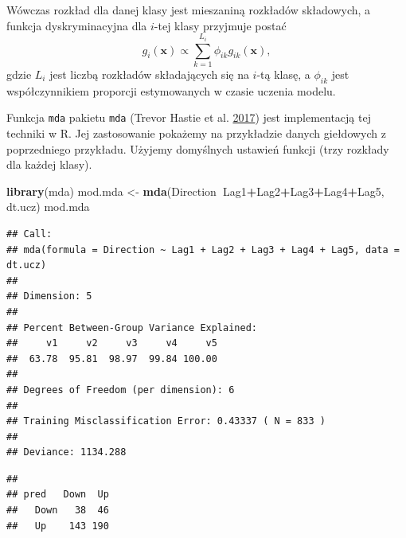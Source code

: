 \documentclass[
]{book}
\newenvironment{Shaded}{\begin{snugshade}}{\end{snugshade}}
\newcommand{\DataTypeTok}[1]{\textcolor[rgb]{0.13,0.29,0.53}{#1}}
\newcommand{\KeywordTok}[1]{\textcolor[rgb]{0.13,0.29,0.53}{\textbf{#1}}}
\newcommand{\NormalTok}[1]{#1}
\newcommand{\OperatorTok}[1]{\textcolor[rgb]{0.81,0.36,0.00}{\textbf{#1}}}
\newcommand{\StringTok}[1]{\textcolor[rgb]{0.31,0.60,0.02}{#1}}
\theoremstyle{plain}
\theoremstyle{definition}
\theoremstyle{definition}
\theoremstyle{definition}
\theoremstyle{definition}
\theoremstyle{remark}
\let\BeginKnitrBlock\begin \let\EndKnitrBlock\end
\begin{document}
Wówczas rozkład dla danej klasy jest mieszaniną rozkładów składowych, a funkcja dyskryminacyjna dla \(i\)-tej klasy przyjmuje postać
\begin{equation}
    g_i(\boldsymbol x)\propto \sum_{k=1}^{L_i}\phi_{ik}g_{ik}(\boldsymbol x),
\end{equation}
gdzie \(L_i\) jest liczbą rozkładów składających się na \(i\)-tą klasę, a \(\phi_{ik}\) jest współczynnikiem proporcji estymowanych w czasie uczenia modelu.

\BeginKnitrBlock{example}
\protect\hypertarget{exm:mda}{}{\label{exm:mda} }Funkcja \texttt{mda} pakietu \texttt{mda} (Trevor Hastie et al. \protect\hyperlink{ref-R-mda}{2017}) jest implementacją tej techniki w R. Jej zastosowanie pokażemy na przykładzie danych giełdowych z poprzedniego przykładu. Użyjemy domyślnych ustawień funkcji (trzy rozkłady dla każdej klasy).
\EndKnitrBlock{example}

\begin{Shaded}
\begin{Highlighting}[]
\KeywordTok{library}\NormalTok{(mda)}
\NormalTok{mod.mda <-}\StringTok{ }\KeywordTok{mda}\NormalTok{(Direction}\OperatorTok{~}\NormalTok{Lag1}\OperatorTok{+}\NormalTok{Lag2}\OperatorTok{+}\NormalTok{Lag3}\OperatorTok{+}\NormalTok{Lag4}\OperatorTok{+}\NormalTok{Lag5, dt.ucz)}
\NormalTok{mod.mda}
\end{Highlighting}
\end{Shaded}

\begin{verbatim}
## Call:
## mda(formula = Direction ~ Lag1 + Lag2 + Lag3 + Lag4 + Lag5, data = dt.ucz)
## 
## Dimension: 5 
## 
## Percent Between-Group Variance Explained:
##     v1     v2     v3     v4     v5 
##  63.78  95.81  98.97  99.84 100.00 
## 
## Degrees of Freedom (per dimension): 6 
## 
## Training Misclassification Error: 0.43337 ( N = 833 )
## 
## Deviance: 1134.288
\end{verbatim}

\begin{Shaded}
\end{Shaded}

\begin{verbatim}
##       
## pred   Down  Up
##   Down   38  46
##   Up    143 190
\end{verbatim}
\end{document}
